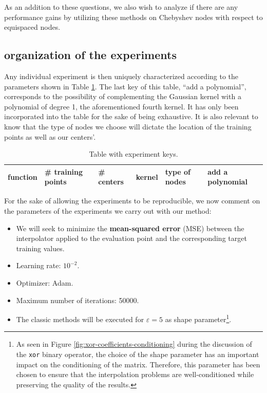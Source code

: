 \documentclass[12pt]{report} %
\begin{document}
As an addition to these questions, we also wish to analyze if there are any performance gains by utilizing these
methods on Chebyshev nodes with respect to equispaced nodes.

\subsection*{organization of the experiments}

Any individual experiment is then uniquely
characterized according to the parameters shown in Table \ref{tab:keys-table}. The last key of this table, ``add a polynomial'', corresponds to the possibility of complementing the Gaussian kernel with a polynomial of degree 1, the aforementioned fourth kernel. It has only been incorporated into the table for the sake of being exhaustive. It is also relevant to know that the type of nodes we choose will dictate the location of the training points as well as our centers'.

\begin{table}[h]
    \centering
    \begin{tabular}{|l|l|l|l|l|l|}
  \hline
  function & \# training points & \# centers & kernel & type of nodes &
  add a polynomial\\
  \hline
\end{tabular}
    \caption{Table with experiment keys.}
    \label{tab:keys-table}
\end{table}

For the sake of allowing the experiments to be reproducible, we now comment on the parameters of the experiments we carry out with our method: \begin{itemize}
    \item We will seek to minimize the \textbf{mean-squared error} (MSE) between the interpolator applied to the evaluation point and the corresponding target training values.
    \item Learning rate: $10^{-2}$.
    \item Optimizer: Adam.
    \item Maximum number of iterations: 50000.
    \item The classic methods will be executed for $\varepsilon=5$ as shape parameter\footnote{As seen in Figure \ref{fig:xor-coefficients-conditioning} during the discussion of the \texttt{xor} binary operator, the choice of the shape parameter has an important impact on the conditioning of the matrix. Therefore, this parameter has been chosen to ensure that the interpolation problems are well-conditioned while preserving the quality of the results.}.
\end{itemize}
\end{document}
